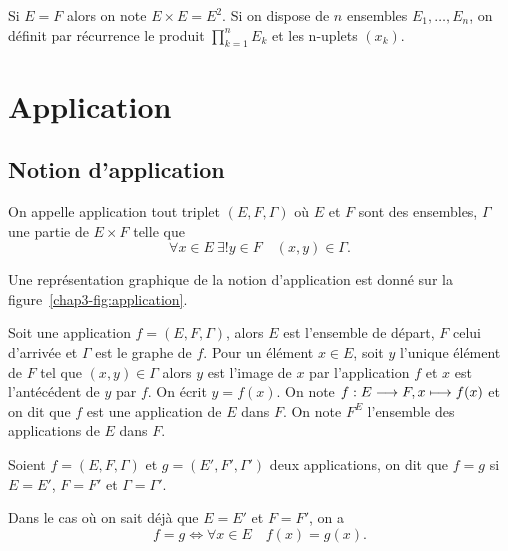 Si \(E = F\) alors on note \(E \times E = E^2\). Si on dispose de \(n\) ensembles
\(E_1, \ldots, E_n\), on définit par récurrence le produit \(\prod_{k = 1}^n E_k\)
et les n-uplets \((x_k)\).

\section{Application}\label{chap3-sec:applications}

\subsection{Notion d'application}\label{chap3-subsec:notiondapplication}

\begin{defdef}
  On appelle application tout triplet \((E, F, \Gamma)\) où \(E\) et \(F\) sont
  des ensembles, \(\Gamma\) une partie de \(E \times F\) telle que
  \begin{equation}
    \forall{}x \in{}E \ \exists! y \in{}F \quad (x,y) \in{}\Gamma.
  \end{equation}
\end{defdef}

Une représentation graphique de la notion d'application est donné sur la
figure~\ref{chap3-fig:application}.

Soit une application \(f = (E,F,\Gamma)\), alors \(E\) est l'ensemble de départ,
\(F\) celui d'arrivée et \(\Gamma\) est le graphe de \(f\).
Pour un élément \(x \in{}E\), soit \(y\) l'unique élément de \(F\) tel que
\((x,y) \in{}\Gamma\) alors \(y\) est l'image de \(x\) par l'application \(f\) et
\(x\) est l'antécédent de \(y\) par \(f\). On écrit \(y = f(x)\). On note
\(f:E \longrightarrow{} F, x \longmapsto{} f(x)\) et on dit que \(f\) est une application de
\(E\) dans \(F\). On note \(F^E\) l'ensemble des applications de \(E\) dans
\(F\).

\begin{defdef}
  Soient \(f = (E, F, \Gamma)\) et \(g = (E', F', \Gamma')\) deux applications, on
  dit que \(f = g\) si \(E = E'\), \(F = F'\) et \(\Gamma = \Gamma'\).
\end{defdef}
Dans le cas où on sait déjà que \(E = E'\) et \(F = F'\), on a
\begin{equation}
  f = g \iff{}\forall{}x \in{}E \quad f(x) = g(x).
\end{equation}

